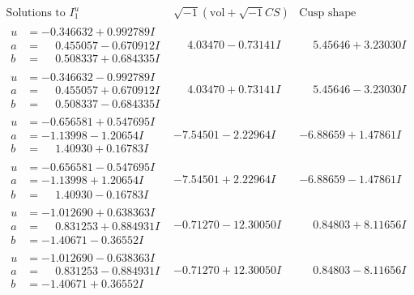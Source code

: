 \documentclass[1p]{elsarticle_modified}
\theoremstyle{definition}
\newcommand{\I}{\sqrt{-1}}
\begin{document}
$$\begin{array}{c|c|c}  
\text{Solutions to }I^u_{1}& \I (\text{vol} + \sqrt{-1}CS) & \text{Cusp shape}\\
 \hline 
\begin{aligned}
u &= -0.346632 + 0.992789 I \\
a &= \phantom{-}0.455057 - 0.670912 I \\
b &= \phantom{-}0.508337 + 0.684335 I\end{aligned}
 & \phantom{-}4.03470 - 0.73141 I & \phantom{-}5.45646 + 3.23030 I \\ \hline\begin{aligned}
u &= -0.346632 - 0.992789 I \\
a &= \phantom{-}0.455057 + 0.670912 I \\
b &= \phantom{-}0.508337 - 0.684335 I\end{aligned}
 & \phantom{-}4.03470 + 0.73141 I & \phantom{-}5.45646 - 3.23030 I \\ \hline\begin{aligned}
u &= -0.656581 + 0.547695 I \\
a &= -1.13998 - 1.20654 I \\
b &= \phantom{-}1.40930 + 0.16783 I\end{aligned}
 & -7.54501 - 2.22964 I & -6.88659 + 1.47861 I \\ \hline\begin{aligned}
u &= -0.656581 - 0.547695 I \\
a &= -1.13998 + 1.20654 I \\
b &= \phantom{-}1.40930 - 0.16783 I\end{aligned}
 & -7.54501 + 2.22964 I & -6.88659 - 1.47861 I \\ \hline\begin{aligned}
u &= -1.012690 + 0.638363 I \\
a &= \phantom{-}0.831253 + 0.884931 I \\
b &= -1.40671 - 0.36552 I\end{aligned}
 & -0.71270 - 12.30050 I & \phantom{-}0.84803 + 8.11656 I \\ \hline\begin{aligned}
u &= -1.012690 - 0.638363 I \\
a &= \phantom{-}0.831253 - 0.884931 I \\
b &= -1.40671 + 0.36552 I\end{aligned}
 & -0.71270 + 12.30050 I & \phantom{-}0.84803 - 8.11656 I \\ \hline\begin{aligned}

\end{aligned}
\end{array}$$
\end{document}
